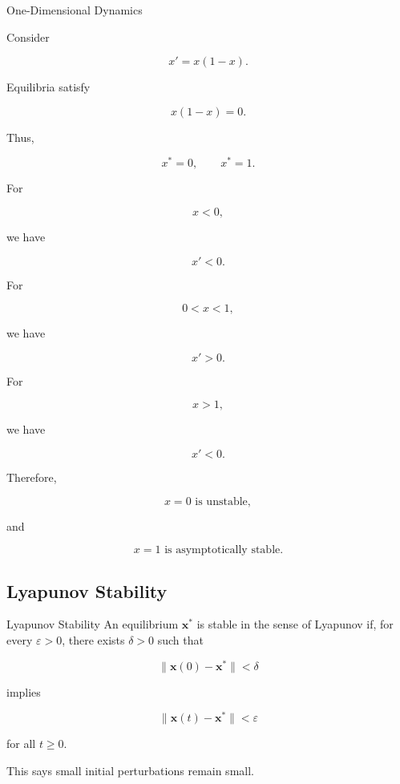\begin{workedexamplebox}{One-Dimensional Dynamics}

Consider

\[
x'
=
x(1-x).
\]

Equilibria satisfy

\[
x(1-x)=0.
\]

Thus,

\[
x^*=0,
\qquad
x^*=1.
\]

For

\[
x<0,
\]

we have

\[
x'<0.
\]

For

\[
0<x<1,
\]

we have

\[
x'>0.
\]

For

\[
x>1,
\]

we have

\[
x'<0.
\]

Therefore,

\begin{answerbox}
\[
\boxed{
x=0
\text{ is unstable},
}
\]

and

\[
\boxed{
x=1
\text{ is asymptotically stable}.
}
\]
\end{answerbox}

\end{workedexamplebox}

\subsection{Lyapunov Stability}
\label{subsec:lyapunov-stability-definition}

\begin{definitionbox}{Lyapunov Stability}
An equilibrium \(\mathbf{x}^*\) is stable in the sense of Lyapunov if,
for every \(\varepsilon>0\), there exists \(\delta>0\) such that

\[
\|
\mathbf{x}(0)-\mathbf{x}^*
\|
<
\delta
\]

implies

\[
\boxed{
\|
\mathbf{x}(t)-\mathbf{x}^*
\|
<
\varepsilon
}
\]

for all \(t\geq0\).
\end{definitionbox}

This says small initial perturbations remain small.

